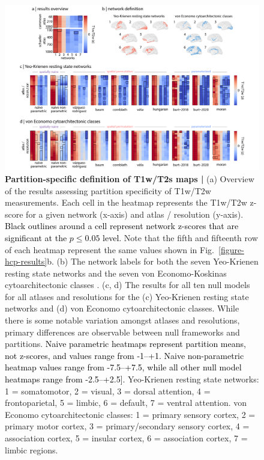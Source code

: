 \documentclass[12pt,aps,pra,reprint,showkeys]{revtex4-1}
\newcommand{\nimg}[1]{\textcolor{black}{{#1}}}
\begin{document}
\begin{figure}[htp]
  \begin{center}
    \centerline{\includegraphics[width=\textwidth]{network_results.png}}
    \caption{
      \textbf{Partition-specific definition of T1w/T2s maps |}
      (a) Overview of the results assessing partition specificity of T1w/T2w measurements.
      Each cell in the heatmap represents the T1w/T2w z-score for a given network (x-axis) and atlas / resolution (y-axis).
      \nimg{Black outlines around a cell represent network z-scores that are significant at the $p \leq 0.05$ level.}
      Note that the fifth and fifteenth row of each heatmap represent the same values shown in Fig.~\ref{figure-hcp-results}b.
      (b) The network labels for both the seven Yeo-Krienen resting state networks \citep{yeo2011organization} and the seven von Economo-Koskinas cytoarchitectonic classes \citep{voneconomo1925cytoarchitecture, scholtens2018neuroimage}.
      (c, d) The results for all ten null models for all atlases and resolutions for the (c) Yeo-Krienen resting state networks and (d) von Economo cytoarchitectonic classes.
      While there is some notable variation amongst atlases and resolutions, primary differences are observable between null frameworks and partitions.
      \nimg{Naive parametric heatmaps represent partition means, not z-scores, and values range from -1--+1.
      Naive non-parametric heatmap values range from -7.5--+7.5, while all other null model heatmaps range from -2.5--+2.5].}
      Yeo-Krienen resting state networks: 1 = somatomotor, 2 = visual, 3 = dorsal attention, 4 = frontoparietal, 5 = limbic, 6 = default, 7 = ventral attention.
      von Economo cytoarchitectonic classes: 1 = primary sensory cortex, 2 = primary motor cortex, 3 = primary/secondary sensory cortex, 4 = association cortex, 5 = insular cortex, 6 = association cortex, 7 = limbic regions.
    }
    \label{figure-network-results}
  \end{center}
\end{figure}
\end{document}
